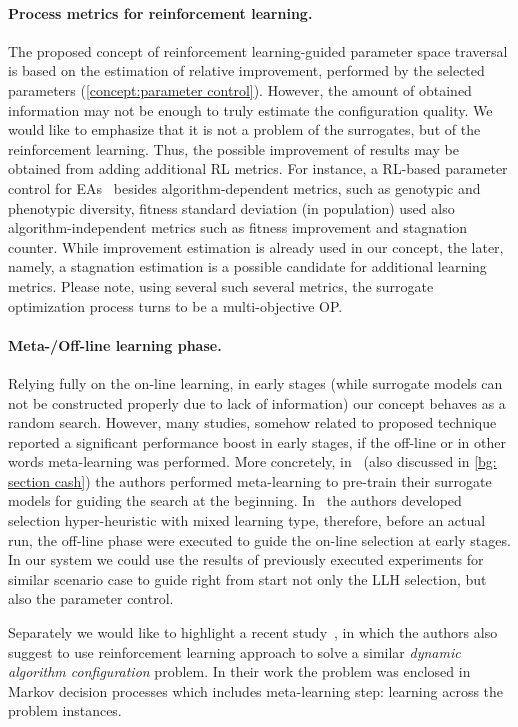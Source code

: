 \paragraph{Process metrics for reinforcement learning.} The proposed concept of reinforcement learning-guided parameter space traversal is based on the estimation of relative improvement, performed by the selected parameters (\cref{concept:parameter control}). However, the amount of obtained information may not be enough to truly estimate the configuration quality. We would like to emphasize that it is not a problem of the surrogates, but of the reinforcement learning. Thus, the possible improvement of results may be obtained from adding additional RL metrics. For instance, a RL-based parameter control for EAs~\cite{karafotias2014generic} besides algorithm-dependent metrics, such as genotypic and phenotypic diversity, fitness standard deviation (in population) used also algorithm-independent metrics such as fitness improvement and stagnation counter. While improvement estimation is already used in our concept, the later, namely, a stagnation estimation is a possible candidate for additional learning metrics. Please note, using several such several metrics, the surrogate optimization process turns to be a multi-objective OP.


\paragraph{Meta-/Off-line learning phase.} Relying fully on the on-line learning, in early stages (while surrogate models can not be constructed properly due to lack of information) our concept behaves as a random search. However, many studies, somehow related to proposed technique reported a significant performance boost in early stages, if the off-line or in other words meta-learning was performed. More concretely, in~\cite{feurer2015efficient} (also discussed in \cref{bg: section cash}) the authors performed meta-learning to pre-train their surrogate models for guiding the search at the beginning. In~\cite{uludaug2013hybrid} the authors developed selection hyper-heuristic with mixed learning type, therefore, before an actual run, the off-line phase were executed to guide the on-line selection at early stages. In our system we could use the results of previously executed experiments for similar scenario case to guide right from start not only the LLH selection, but also the parameter control. 

Separately we would like to highlight a recent study~\cite{biedenkapp-ecai20}, in which the authors also suggest to use reinforcement learning approach to solve a similar \emph{dynamic algorithm configuration} problem. In their work the problem was enclosed in Markov decision processes which includes meta-learning step: learning across the problem instances.


